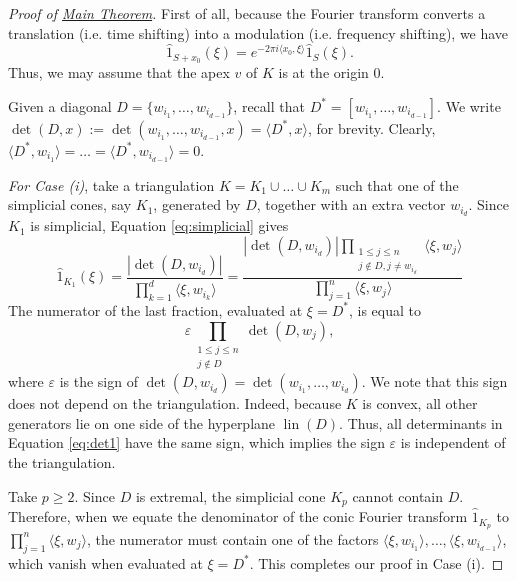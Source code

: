 \documentclass{article}
\DeclareMathOperator{\lin}{lin}
\begin{document}
\begin{proof}[Proof of \texorpdfstring{\hyperref[thm:MAIN]{Main Theorem}}{Main Theorem}]
	First of all, because the Fourier transform converts a translation (i.e. time shifting) into a modulation (i.e. frequency shifting), we have
\begin{equation}
	\hat{1}_{S+x_0} (\xi) = e^{-2 \pi i \langle x_0, \xi \rangle} \hat{1}_S(\xi).
\end{equation}
Thus, we may assume that the apex $v$ of $K$ is at the origin $0$.

Given a diagonal $D = \{w_{i_1}, \dots, w_{i_{d-1}}\}$, recall that $D^* = [w_{i_1}, \dots, w_{i_{d-1}}]$. We write $\det(D, x) := \det(w_{i_1}, \dots, w_{i_{d-1}}, x) = \langle D^*, x \rangle$, for brevity. Clearly, $\langle D^*, w_{i_1} \rangle = \dots = \langle D^*, w_{i_{d-1}} \rangle = 0$.
    
    \medskip
    
	\emph{For Case (i)}, take a triangulation $K = K_1 \cup \dots \cup K_m$ such that one of the simplicial cones, say $K_1$, generated by $D$, together with an extra vector $w_{i_d}$. Since $K_1$ is simplicial, Equation \ref{eq:simplicial} gives
    \begin{equation}
    	\hat{1}_{K_1}(\xi) = \frac{|\det(D, w_{i_d})|}{\prod_{k=1}^d \langle \xi, w_{i_k} \rangle} = \frac{|\det(D, w_{i_d})| \prod_{\substack{1 \leq j \leq n \\ j \notin D, j \neq w_{i_d}}} \langle \xi, w_{j}\rangle}{\prod_{j=1}^n \langle \xi, w_{j} \rangle}
    \end{equation}
    The numerator of the last fraction, evaluated at $\xi=D^*$, is equal to 
    \begin{equation}\label{eq:det1}
    	\varepsilon \prod_{\substack{1 \leq j \leq n \\ j \notin D}} \det(D, w_j),
    \end{equation} 
    where $\varepsilon$ is the sign of $\det(D, w_{i_d}) = \det(w_{i_1}, \dots, w_{i_d})$. We note that this sign does not depend on the triangulation. Indeed, because $K$ is convex, all other generators lie on one side of the hyperplane $\lin(D)$. Thus, all determinants in Equation \ref{eq:det1} have the same sign, which implies the sign $\varepsilon$ is independent of the triangulation.
		
	Take $p \geq 2$. Since $D$ is extremal, the simplicial cone $K_p$ cannot contain $D$. Therefore, when we equate the denominator of the conic Fourier transform $\hat{1}_{K_p}$ to $\prod_{j=1}^n \langle \xi, w_{j} \rangle$, the numerator must contain one of the factors $\langle \xi, w_{i_1} \rangle, \dots, \langle \xi, w_{i_{d-1}} \rangle$, which vanish when evaluated at $\xi = D^*$. This completes our proof in Case (i).
    

\end{proof}
\end{document}
